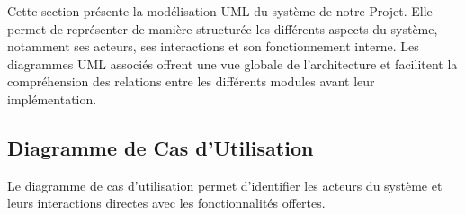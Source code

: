 Cette section présente la modélisation UML du système de notre Projet. Elle permet de représenter de manière structurée les différents aspects du système, notamment ses acteurs, ses interactions et son fonctionnement interne. Les diagrammes UML associés offrent une vue globale de l’architecture et facilitent la compréhension des relations entre les différents modules avant leur implémentation.

\subsection{Diagramme de Cas d'Utilisation}

Le diagramme de cas d’utilisation permet d’identifier les acteurs du système et leurs interactions directes avec les fonctionnalités offertes.

